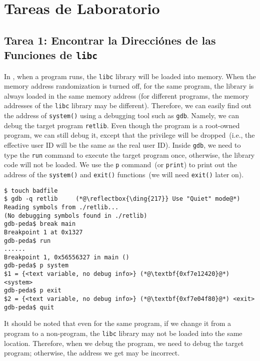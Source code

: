 \section{Tareas de Laboratorio}



\subsection{Tarea 1: Encontrar la Direcciónes de las Funciones de \texttt{libc} } 

In \linux, when a program runs, the \texttt{libc} library will be loaded
into memory. When the memory address randomization is turned off,
for the same program, the library is always loaded in the same memory
address (for different programs, the memory addresses
of the \texttt{libc} library may be different).
Therefore, we can easily find out the address of \texttt{system()}
using a debugging tool such as \texttt{gdb}. Namely, we can debug
the target program \texttt{retlib}. Even though the program is a root-owned \setuid program,
we can still debug it, except that the privilege will be dropped~(i.e., the effective user ID
will be the same as the real user ID).
Inside \texttt{gdb}, we need to type the \texttt{run} command to execute the target program once,
otherwise, the library code will not be loaded.
We use the \texttt{p} command~(or \texttt{print}) to print out the address of
the \texttt{system()} and \texttt{exit()} functions~(we will need \texttt{exit()} later on).

\begin{lstlisting}
$ touch badfile
$ gdb -q retlib     (*@\reflectbox{\ding{217}} Use "Quiet" mode@*)
Reading symbols from ./retlib...
(No debugging symbols found in ./retlib)
gdb-peda$ break main
Breakpoint 1 at 0x1327
gdb-peda$ run
......
Breakpoint 1, 0x56556327 in main ()
gdb-peda$ p system
$1 = {<text variable, no debug info>} (*@\textbf{0xf7e12420}@*) <system>
gdb-peda$ p exit
$2 = {<text variable, no debug info>} (*@\textbf{0xf7e04f80}@*) <exit>
gdb-peda$ quit
\end{lstlisting}

It should be noted that even for the same program, if we change it from a \setuid
program to a non-\setuid program, the \texttt{libc} library may not be loaded
into the same location. Therefore, when we debug the program, we need
to debug the target \setuid program; otherwise, the address we
get may be incorrect.

